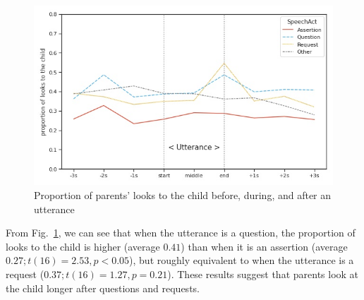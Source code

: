 \begin{figure}[H]

\begin{center}
	\includegraphics[width =1\textwidth]{figures/gaze-pattern-adult.jpg}
	\caption{Proportion of parents' looks to the child before, during, and after an utterance} \label{fig:attention}
\end{center}
\end{figure}


From Fig.~\ref{fig:attention}, we can see that when the utterance is a question, the proportion of looks to the child is higher (average $0.41$) than when it is an assertion (average $0.27; t(16) = 2.53, p <0.05$), but roughly equivalent to when the utterance is a request ($0.37; t(16)= 1.27, p=0.21$). These results suggest that parents look at the child longer after questions and requests. %

